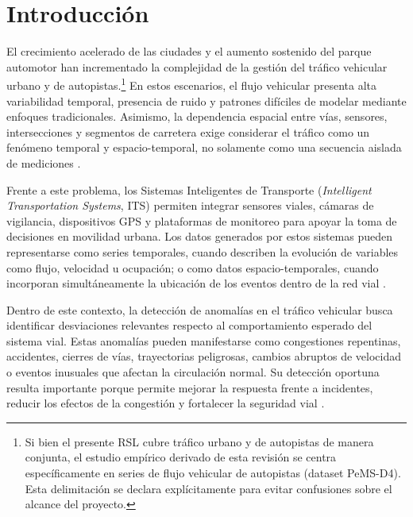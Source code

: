 \documentclass[12pt, a4paper]{article}
\begin{document}
\section{Introducci\'{o}n}
\label{sec:intro}

El crecimiento acelerado de las ciudades y el aumento sostenido del parque automotor han incrementado la complejidad de la gesti\'{o}n del tr\'{a}fico vehicular urbano y de autopistas.\footnote{Si bien el presente RSL cubre tr\'{a}fico urbano y de autopistas de manera conjunta, el estudio emp\'{i}rico derivado de esta revisi\'{o}n se centra espec\'{i}ficamente en series de flujo vehicular de autopistas (dataset PeMS-D4). Esta delimitaci\'{o}n se declara expl\'{i}citamente para evitar confusiones sobre el alcance del proyecto.} En estos escenarios, el flujo vehicular presenta alta variabilidad temporal, presencia de ruido y patrones dif\'{i}ciles de modelar mediante enfoques tradicionales. Asimismo, la dependencia espacial entre v\'{i}as, sensores, intersecciones y segmentos de carretera exige considerar el tr\'{a}fico como un fen\'{o}meno temporal y espacio-temporal, no solamente como una secuencia aislada de mediciones \cite{taheri2026applicability}.

Frente a este problema, los Sistemas Inteligentes de Transporte (\textit{Intelligent Transportation Systems}, ITS) permiten integrar sensores viales, c\'{a}maras de vigilancia, dispositivos GPS y plataformas de monitoreo para apoyar la toma de decisiones en movilidad urbana. Los datos generados por estos sistemas pueden representarse como series temporales, cuando describen la evoluci\'{o}n de variables como flujo, velocidad u ocupaci\'{o}n; o como datos espacio-temporales, cuando incorporan simult\'{a}neamente la ubicaci\'{o}n de los eventos dentro de la red vial \cite{zhang2022automatic}.

Dentro de este contexto, la detecci\'{o}n de anomal\'{i}as en el tr\'{a}fico vehicular busca identificar desviaciones relevantes respecto al comportamiento esperado del sistema vial. Estas anomal\'{i}as pueden manifestarse como congestiones repentinas, accidentes, cierres de v\'{i}as, trayectorias peligrosas, cambios abruptos de velocidad o eventos inusuales que afectan la circulaci\'{o}n normal. Su detecci\'{o}n oportuna resulta importante porque permite mejorar la respuesta frente a incidentes, reducir los efectos de la congesti\'{o}n y fortalecer la seguridad vial \cite{khan2022anomaly}.
\end{document}
